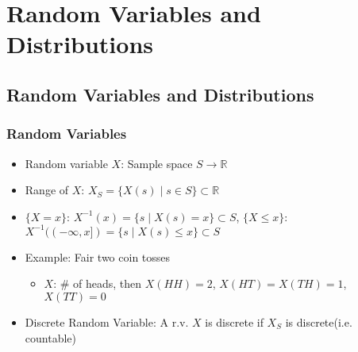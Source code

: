 \section{Random Variables and Distributions}

\subsection{Random Variables and Distributions}

\subsubsection*{Random Variables}
\begin{itemize}
    \item Random variable $X$: Sample space $S\to\mathbb{R}$
    \item Range of $X$: $X_S=\{X(s)\mid s\in S\}\subset\mathbb{R}$
    \item $\{X=x\}$: $X^{-1}(x)=\{s\mid X(s)=x\}\subset S$, $\{X\leq x\}$: $X^{-1}((-\infty,x])=\{s\mid X(s)\leq x\}\subset S$
    \item Example: Fair two coin tosses
    \begin{itemize}
        \item $X$: \# of heads, then $X(HH)=2$, $X(HT)=X(TH)=1$, $X(TT)=0$
    \end{itemize}
    \item Discrete Random Variable: A r.v. $X$ is discrete if $X_S$ is discrete(i.e. countable)
\end{itemize}

